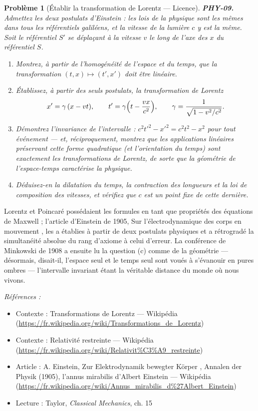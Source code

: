 \documentclass[11pt]{article}
\newtheorem{problem}{Problème}
\newenvironment{refs}{\par\small\noindent\emph{Références :}\begin{itemize}\setlength\itemsep{0pt}}{\end{itemize}\normalsize}
\begin{document}
\bigskip

\begin{problem}[{Établir la transformation de Lorentz --- Licence}]
\textbf{PHY-09.} Admettez les deux postulats d'Einstein : les lois de la physique sont les
mêmes dans tous les référentiels galiléens, et la vitesse de la lumière $c$ y est la même. Soit
le référentiel $S'$ se déplaçant à la vitesse $v$ le long de l'axe des $x$ du référentiel
$S$.
\begin{enumerate}
\item[(a)] Montrez, à partir de l'homogénéité de l'espace et du temps, que la transformation
$(t, x) \mapsto (t', x')$ doit être linéaire.
\item[(b)] Établissez, à partir des seuls postulats, la transformation de Lorentz
\[ x' = \gamma\,(x - vt), \qquad t' = \gamma\Bigl(t - \frac{vx}{c^2}\Bigr), \qquad
\gamma = \frac{1}{\sqrt{1 - v^2/c^2}}. \]
\item[(c)] Démontrez l'invariance de l'intervalle : $c^2 t'^2 - x'^2 = c^2 t^2 - x^2$ pour tout
événement --- et, réciproquement, montrez que les applications linéaires préservant cette forme
quadratique (et l'orientation du temps) sont exactement les transformations de Lorentz, de sorte
que la géométrie de l'espace-temps caractérise la physique.
\item[(d)] Déduisez-en la dilatation du
temps, la contraction des longueurs et la loi de composition des vitesses, et vérifiez que $c$
est un point fixe de cette dernière.
\end{enumerate}

\end{problem}

\noindent Lorentz et Poincaré possédaient les formules en tant que propriétés des
équations de Maxwell ; l'article d'Einstein de 1905, \og{} Sur l'électrodynamique des corps en
mouvement \fg{}, les a établies à partir de deux postulats physiques et a rétrogradé la simultanéité
absolue du rang d'axiome à celui d'erreur. La conférence de Minkowski de 1908 a ensuite lu la
question (c) comme de la géométrie --- désormais, disait-il, l'espace seul et le temps seul sont
voués à s'évanouir en pures ombres --- l'intervalle invariant étant la véritable distance du monde
où nous vivons.

\begin{refs}
\item Contexte : Transformations de Lorentz --- Wikipédia (\url{https://fr.wikipedia.org/wiki/Transformations_de_Lorentz})
\item Contexte : Relativité restreinte --- Wikipédia (\url{https://fr.wikipedia.org/wiki/Relativit%C3%A9_restreinte})
\item Article : A. Einstein, \og{} Zur Elektrodynamik bewegter Körper \fg{}, Annalen der Physik (1905), l'annus mirabilis d'Albert Einstein --- Wikipédia (\url{https://fr.wikipedia.org/wiki/Annus_mirabilis_d%27Albert_Einstein})
\item Lecture : Taylor, \textit{Classical Mechanics}, ch. 15
\end{refs}
\end{document}
